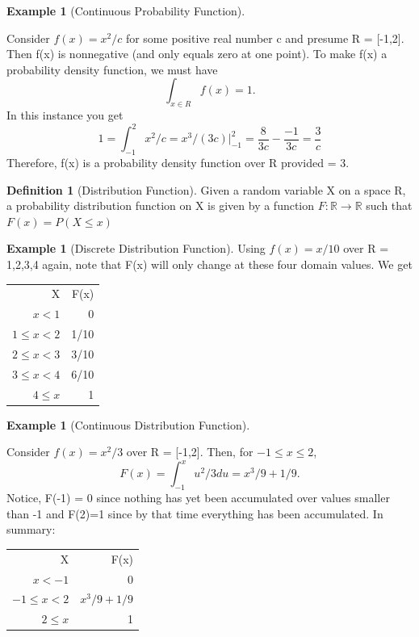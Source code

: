 \documentclass[10pt,]{book}
\theoremstyle{plain}
\theoremstyle{definition}
\newtheorem{definition}[theorem]{Definition}
\theoremstyle{definition}
\newtheorem{example}[theorem]{Example}
\numberwithin{equation}{section}
\newcommand{\hrulemedium}{\noalign{\hrule height 0.07em}}
\newcommand{\lt}{ < }
\begin{document}
\begin{example}[Continuous Probability Function]\label{example-18}

	Consider \(f(x) = x^2/c\) for some positive real number c and presume R = [-1,2]. Then f(x) is nonnegative (and only equals zero at one point). To make f(x) a probability density function, we must have
	\begin{equation*}\int_{x \in R} f(x) = 1.\end{equation*}
	In this instance you get
	\begin{equation*}1 = \int_{-1}^2 x^2/c = x^3/(3c) |_{-1}^2 = \frac{8}{3c} - \frac{-1}{3c} = \frac{3}{c}\end{equation*}
	Therefore, f(x) is a probability density function over R provided   = 3.
\end{example}
\begin{definition}[Distribution Function]\label{definition-29}
Given a random variable X on a space R, a probability distribution function on X is given by a function 
				   \(F:\mathbb{R} \rightarrow \mathbb{R}\) such that \(\displaystyle F(x)=P(X \le x)\)\end{definition}
\begin{example}[Discrete Distribution Function]\label{example-19}
Using \(f(x) = x/10\) over R = {1,2,3,4} again, note that F(x) will only change at these four domain values. We get
	
	\leavevmode%
\begin{table}
\centering
\begin{tabular}{rr}
X&F(x)\tabularnewline\hrulemedium
\(x \lt 1\)&0\tabularnewline[0pt]
\(1 \le x \lt 2\)&1/10\tabularnewline[0pt]
\(2 \le x \lt 3\)&3/10\tabularnewline[0pt]
\(3 \le x \lt 4\)&6/10\tabularnewline[0pt]
\(4 \le x \)&1
\end{tabular}
\end{table}

\end{example}
\begin{example}[Continuous Distribution Function]\label{example-20}

	Consider \(f(x) = x^2/3\) over R = [-1,2].  Then, for \(-1 \le x \le 2\),
	\begin{equation*}F(x) = \int_{-1}^x u^2/3 du = x^3/9 + 1/9.\end{equation*}
	Notice, F(-1) = 0 since nothing has yet been accumulated over values smaller than -1 and F(2)=1 since by that time everything has been accumulated. In summary:
	
	\leavevmode%
\begin{table}
\centering
\begin{tabular}{rr}
X&F(x)\tabularnewline\hrulemedium
\(x \lt -1\)&0\tabularnewline[0pt]
\(-1 \le x \lt 2\)&\(x^3/9 + 1/9\)\tabularnewline[0pt]
\(2 \le x\)&1
\end{tabular}
\end{table}

	
	
\end{example}
\typeout{************************************************}
\typeout{************************************************}
\end{document}
